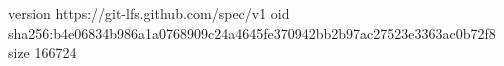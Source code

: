 version https://git-lfs.github.com/spec/v1
oid sha256:b4e06834b986a1a0768909c24a4645fe370942bb2b97ac27523e3363ac0b72f8
size 166724
